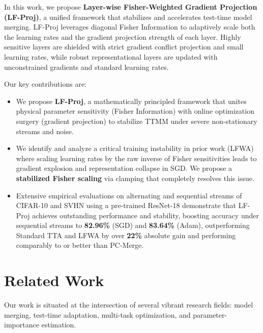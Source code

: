 \documentclass{article}
\theoremstyle{plain}
\theoremstyle{definition}
\theoremstyle{remark}
\begin{document}
In this work, we propose \textbf{Layer-wise Fisher-Weighted Gradient Projection (LF-Proj)}, a unified framework that stabilizes and accelerates test-time model merging. LF-Proj leverages diagonal Fisher Information to adaptively scale both the learning rates and the gradient projection strength of each layer. Highly sensitive layers are shielded with strict gradient conflict projection and small learning rates, while robust representational layers are updated with unconstrained gradients and standard learning rates.

Our key contributions are:
\begin{itemize}
    \item We propose \textbf{LF-Proj}, a mathematically principled framework that unites physical parameter sensitivity (Fisher Information) with online optimization surgery (gradient projection) to stabilize TTMM under severe non-stationary streams and noise.
    \item We identify and analyze a critical training instability in prior work (LFWA) where scaling learning rates by the raw inverse of Fisher sensitivities leads to gradient explosion and representation collapse in SGD. We propose a \textbf{stabilized Fisher scaling} via clamping that completely resolves this issue.
    \item Extensive empirical evaluations on alternating and sequential streams of CIFAR-10 and SVHN using a pre-trained ResNet-18 demonstrate that LF-Proj achieves outstanding performance and stability, boosting accuracy under sequential streams to \textbf{82.96\%} (SGD) and \textbf{83.64\%} (Adam), outperforming Standard TTA and LFWA by over \textbf{22\%} absolute gain and performing comparably to or better than PC-Merge.
\end{itemize}

\section{Related Work}
\label{sec:related_work}

Our work is situated at the intersection of several vibrant research fields: model merging, test-time adaptation, multi-task optimization, and parameter-importance estimation.
\end{document}
